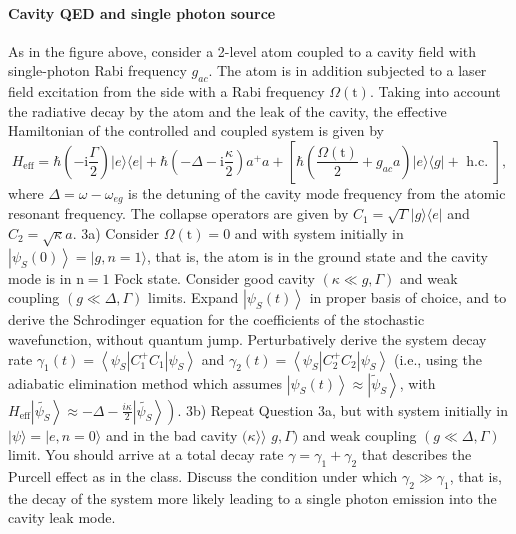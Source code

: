 \documentclass[hyperref, a4paper]{article}
\newcommand*{\ii}{\mathrm{i}}
\begin{document}
\paragraph{}

\paragraph{Cavity QED and single photon source} As in the figure above, consider a 2-level atom coupled to a cavity field with single-photon Rabi frequency $g_{a c}$. The atom is in addition subjected to a laser field excitation from the side with a Rabi frequency $\Omega(\mathrm{t})$. Taking into account the radiative decay by the atom and the leak of the cavity, the effective Hamiltonian of the controlled and coupled system is given by
\begin{equation}
    H_\text{eff}=\hbar\left(- \ii \frac{\Gamma}{2}\right)|e\rangle\langle e|+\hbar\left(-\Delta- \ii \frac{\kappa}{2}\right) a^{+} a+\left[\hbar\left(\frac{\Omega(\mathrm{t})}{2}+g_{a c} a\right)|e\rangle\langle g|+\text { h.c. }\right],
\end{equation}
where $\Delta=\omega-\omega_{e g}$ is the detuning of the cavity mode frequency from the atomic resonant frequency. The collapse operators are given by $C_{1}=\sqrt{\Gamma}|g\rangle\langle e|$ and $C_{2}=\sqrt{\kappa} a$.
3a) Consider $\Omega(\mathrm{t})=0$ and with system initially in $\left|\psi_{S}(0)\right\rangle=|g, n=1\rangle$, that is, the atom is in the ground state and the cavity mode is in $\mathrm{n}=1$ Fock state. Consider good cavity $(\kappa \ll g, \Gamma)$ and weak coupling $(g \ll \Delta, \Gamma)$ limits. Expand $\left|\psi_{S}(t)\right\rangle$ in proper basis of choice, and to derive the Schrodinger equation for the coefficients of the stochastic wavefunction, without quantum jump. Perturbatively derive the system decay rate $ \gamma_{1}(t)=\left\langle\psi_{S}\left|C_{1}^{+} C_{1}\right| \psi_{S}\right\rangle$ and $ \gamma_{2}(t)=\left\langle\psi_{S}\left|C_{2}^{+} C_{2}\right| \psi_{S}\right\rangle$ (i.e., using the adiabatic elimination method which assumes $\left|\psi_{S}(t)\right\rangle \approx\left|\widetilde{\psi}_{S}\right\rangle$, with $\left.H_\text{eff}\left|\widetilde{\psi_{S}}\right\rangle \approx-\Delta-\frac{i \kappa}{2}\left|\widetilde{\psi_{S}}\right\rangle\right)$.
3b) Repeat Question 3a, but with system initially in $|\psi\rangle=|e, n=0\rangle$ and in the bad cavity $(\kappa\rangle\rangle$ $g, \Gamma)$ and weak coupling $(g \ll \Delta, \Gamma)$ limit. You should arrive at a total decay rate $\gamma=\gamma_{1}+\gamma_{2}$ that describes the Purcell effect as in the class. Discuss the condition under which $\gamma_{2} \gg \gamma_{1}$, that is, the decay of the system more likely leading to a single photon emission into the cavity leak mode.
\end{document}
